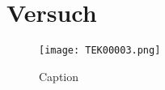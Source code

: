\part{Versuch}
\begin{figure}[H]
    \centering
    \texttt{[image: TEK00003.png]}
    \caption{Caption}
    \label{fig:my_label}
\end{figure}